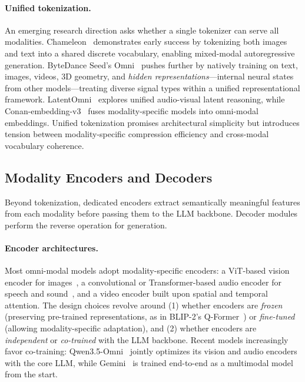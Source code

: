 \documentclass{article}
\begin{document}
\paragraph{Unified tokenization.}
An emerging research direction asks whether a single tokenizer can serve all modalities.
Chameleon~\cite{jiang2024chameleon} demonstrates early success by tokenizing both images and text into a shared discrete vocabulary, enabling mixed-modal autoregressive generation.
ByteDance Seed's Omni~\cite{seed2026omni} pushes further by natively training on text, images, videos, 3D geometry, and \emph{hidden representations}---internal neural states from other models---treating diverse signal types within a unified representational framework.
LatentOmni~\cite{placeholder2026latentomni} explores unified audio-visual latent reasoning, while Conan-embedding-v3~\cite{placeholder2026conan} fuses modality-specific models into omni-modal embeddings.
Unified tokenization promises architectural simplicity but introduces tension between modality-specific compression efficiency and cross-modal vocabulary coherence.

\subsection{Modality Encoders and Decoders}

Beyond tokenization, dedicated encoders extract semantically meaningful features from each modality before passing them to the LLM backbone.
Decoder modules perform the reverse operation for generation.

\paragraph{Encoder architectures.}
Most omni-modal models adopt modality-specific encoders: a ViT-based vision encoder for images~\cite{dosovitskiy2021vit}, a convolutional or Transformer-based audio encoder for speech and sound~\cite{radford2023whisper}, and a video encoder built upon spatial and temporal attention.
The design choices revolve around (1) whether encoders are \emph{frozen} (preserving pre-trained representations, as in BLIP-2's Q-Former~\cite{li2023blip2}) or \emph{fine-tuned} (allowing modality-specific adaptation), and (2) whether encoders are \emph{independent} or \emph{co-trained} with the LLM backbone.
Recent models increasingly favor co-training: Qwen3.5-Omni~\cite{qwen2026omni} jointly optimizes its vision and audio encoders with the core LLM, while Gemini~\cite{google2024gemini} is trained end-to-end as a multimodal model from the start.
\end{document}
